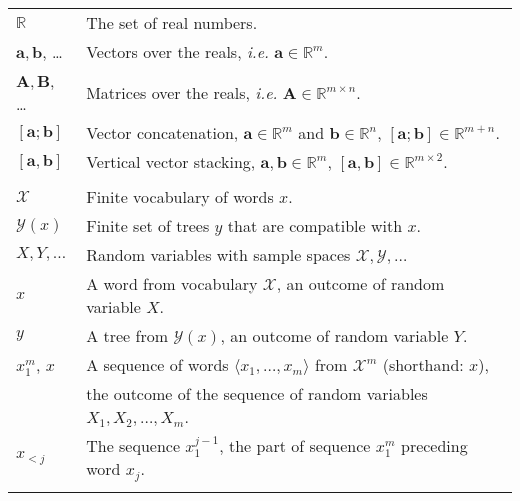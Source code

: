 \documentclass[11pt]{article}
\begin{document}
\begin{table}[h]
\center

  \begin{tabular}{l|l}
    \hline\hline
    $\mathbb{R}$  & The set of real numbers.   \\
    $\mathbf{a}, \mathbf{b}$, \dots  & Vectors over the reals, \textit{i.e.} $\mathbf{a} \in \mathbb{R}^m$.  \\
    $\mathbf{A}, \mathbf{B}$, \dots & Matrices over the reals, \textit{i.e.} $\mathbf{A} \in \mathbb{R}^{m \times n}$.   \\
    $[\mathbf{a}; \mathbf{b}]$  & Vector concatenation, $\mathbf{a} \in \mathbb{R}^{m}$ and $\mathbf{b} \in \mathbb{R}^{n}$, $[\mathbf{a}; \mathbf{b}] \in \mathbb{R}^{m+n}$.  \\
    $[\mathbf{a}, \mathbf{b}]$  & Vertical vector stacking, $\mathbf{a}, \mathbf{b} \in \mathbb{R}^{m}$, $[\mathbf{a}, \mathbf{b}] \in \mathbb{R}^{m \times 2}$.  \\
    & \\

    $\mathcal{X}$ & Finite vocabulary of words $x$. \\
    $\mathcal{Y}(x)$ & Finite set of trees $y$ that are compatible with $x$.  \\
    $X, Y, \dots$ & Random variables with sample spaces $\mathcal{X}, \mathcal{Y}, \dots$  \\
    $x$ & A word from vocabulary $\mathcal{X}$, an outcome of random variable $X$.   \\
    $y$ & A tree from $\mathcal{Y}(x)$, an outcome of random variable $Y$.  \\
    $x_1^m$, $x$ & A sequence of words $\langle x_1, \dots, x_m \rangle$ from $\mathcal{X}^m$ (shorthand: $x$), \\ & the outcome of the sequence of random variables $X_1, X_2, \dots, X_m$.   \\
    $x_{<j}$ & The sequence $x_{1}^{j-1}$, the part of sequence $x_1^m$ preceding word $x_j$.   \\
    & \\



\end{tabular}
\end{table}
\end{document}

